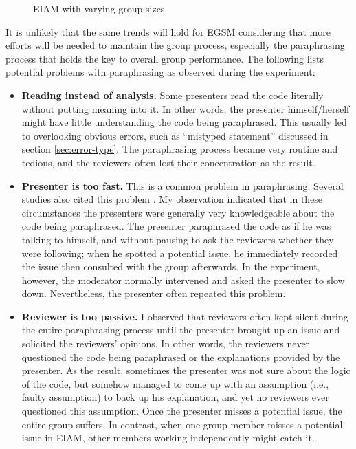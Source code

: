 \begin{figure}[htb]
 {\centerline{}}
 \caption{EIAM with varying group sizes}
 \label{group-size-variation}
\end{figure}


It is unlikely that the same trends will hold for EGSM considering
that more efforts will be needed to maintain the group process,
especially the paraphrasing process that
holds the key to overall group performance. 
The following lists potential problems with 
paraphrasing as observed during the experiment:

\begin{itemize}

\item {\bf Reading  instead of analysis.}
Some presenters read the code literally without putting meaning into
it. In other words, the presenter himself/herself might have little
understanding the code being paraphrased. This usually led to 
overlooking obvious errors, such as ``mistyped statement'' discussed
in section \ref{sec:error-type}. The paraphrasing process became
very routine and tedious, and the reviewers often lost their
concentration as the result.

\item {\bf Presenter is too fast.}
This is a common problem in paraphrasing. Several studies also cited
this problem \cite{Russell91,Deimel91}.
My observation indicated that in these circumstances the presenters
were generally very knowledgeable about the code being
paraphrased. The presenter paraphrased the 
code as if he was talking to himself, and without pausing to ask the
reviewers whether they were following; when he spotted a potential issue, he
immediately recorded the issue then consulted with the group
afterwards. In the experiment, however, the moderator normally
intervened and asked the presenter to slow down. Nevertheless,
the presenter often repeated this problem.

\item {\bf Reviewer is too passive.}
I observed that reviewers often kept silent during the
entire paraphrasing process until the presenter brought up an issue
and solicited the reviewers' opinions.
In other words, the reviewers never questioned the code being
paraphrased or the explanations provided by the presenter. As the result,
sometimes the presenter was
not sure about the logic of the code, but somehow managed to come
up with an assumption (i.e., faulty assumption) to back up his
explanation, and yet no reviewers ever questioned this assumption.
Once the presenter misses a potential issue, the entire group
suffers. In contrast, when one group member misses a potential 
issue in EIAM, other members working independently might catch it.



\end{itemize}
